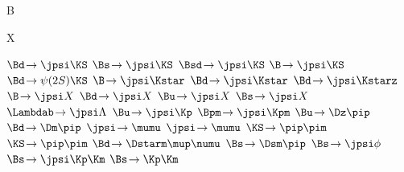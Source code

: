 
\newmathsymbol{\BF}           {\cal B\xspace}
\newmathsymbol{\BR}           {\BF}

\renewcommand{\to}            {\ensuremath{\rightarrow}\xspace}
\newcommand{\decay}[2]        {\ensuremath{#1\!\to #2}\xspace}

\newmathsymbol{\Xparticle}      {X\xspace}

\newmathsymbol{\BdToJpsiKS}      {\decay{\Bd}{\jpsi\KS}}
\newmathsymbol{\BsToJpsiKS}      {\decay{\Bs}{\jpsi\KS}}
\newmathsymbol{\BsdToJpsiKS}     {\decay{\Bsd}{\jpsi\KS}}
\newmathsymbol{\BToJpsiKS}       {\decay{\B}{\jpsi\KS}}
\newmathsymbol{\BdToPsiTwoSKS}   {\decay{\Bd}{\psi(2S)\KS}}
\newmathsymbol{\BToJpsiKstar}    {\decay{\B}{\jpsi\Kstar}}
\newmathsymbol{\BdToJpsiKstar}   {\decay{\Bd}{\jpsi\Kstar}}
\newmathsymbol{\BdToJpsiKstarz}  {\decay{\Bd}{\jpsi\Kstarz}}
\newmathsymbol{\BToJpsiX}        {\decay{\B}{\jpsi X}}
\newmathsymbol{\BdToJpsiX}       {\decay{\Bd}{\jpsi X}}
\newmathsymbol{\BuToJpsiX}       {\decay{\Bu}{\jpsi X}}
\newmathsymbol{\BsToJpsiX}       {\decay{\Bs}{\jpsi X}}
\newmathsymbol{\LbToJpsiLambda}  {\decay{\Lambdab}{\jpsi\Lambda}}
\newmathsymbol{\BuToJpsiK}       {\decay{\Bu}{\jpsi\Kp}}
\newmathsymbol{\BuToJpsiKcc}     {\decay{\Bpm}{\jpsi\Kpm}}
\newmathsymbol{\BuToDpi}         {\decay{\Bu}{\Dz\pip}}
\newmathsymbol{\BdToDpi}         {\decay{\Bd}{\Dm\pip}}
\newmathsymbol{\JpsiToMuMu}      {\decay{\jpsi}{\mumu}}
\newmathsymbol{\JpsiTomumu}      {\decay{\jpsi}{\mumu}}
\newmathsymbol{\KSToPiPi}        {\decay{\KS}{\pip\pim}}
\newmathsymbol{\KSTopipi}        {\decay{\KS}{\pip\pim}}
\newmathsymbol{\BdToDstarmunu}   {\decay{\Bd}{\Dstarm\mup\numu}}
\newmathsymbol{\BsToDspi}        {\decay{\Bs}{\Dsm\pip}}
\newmathsymbol{\BsToJpsiphi}     {\decay{\Bs}{\jpsi\phi}}
\newmathsymbol{\BsToJpsiKK}      {\decay{\Bs}{\jpsi\Kp\Km}}
\newmathsymbol{\BsToKK}          {\decay{\Bs}{\Kp\Km}}
\newmathsymbol{\inclJPsi}        {\ \jpsi}

\newcommand{\BdToJpsiKSbfsf}  {\ensuremath{\mathbfsfit{
  \decay{\B^{\mathbfsfup{0}}}{\jpsi K_\text{S}^{\mathbfsfup{0}}}   
}}\xspace}
\newcommand{\BsToJpsiKSbfsf}  {\ensuremath{\mathbfsfit{
  \decay{\B_\squark^{\mathbfsfup{0}}}{\jpsi K_\text{S}^{\mathbfsfup{0}}}   
}}\xspace}
\newcommand{\BsdToJpsiKSbfsf} {\ensuremath{\mathbfsfit{
  \decay{\B_{(\squark)}^{\mathbfsfup{0}}}{\jpsi K_\text{S}^{\mathbfsfup{0}}}   
}}\xspace}
\newcommand{\BToJpsiKSbfsf}   {\ensuremath{\mathbfsfit{
  \decay{\B}{\jpsi K_\text{S}^{\mathbfsfup{0}}}   
}}\xspace}
\newcommand{\BToJpsiKstarbfsf}{\ensuremath{\mathbfsfit{
  \decay{\B}{\jpsi K^{\mathsf{\ast}}}   
}}\xspace}
\newcommand{\BdToJpsiKstarzbfsf}{\ensuremath{\mathbfsfit{
  \decay{\B^{\mathbfsfup{0}}}{\jpsi K^{\mathsf{\ast}\mathbfsfup{0}}}   
}}\xspace}
\newcommand{\BToJpsiXbfsf}{\ensuremath{\mathbfsfit{
  \decay{\B}{\jpsi X}
}}\xspace}
\newcommand{\jpsibfsf}{\ensuremath{\mathbfsfit{\jpsi}}\xspace}
\newcommand{\JpsiTomumubfsf}{\ensuremath{\mathbfsfit{
  \decay{\jpsi}{\mumu}
}}\xspace}

